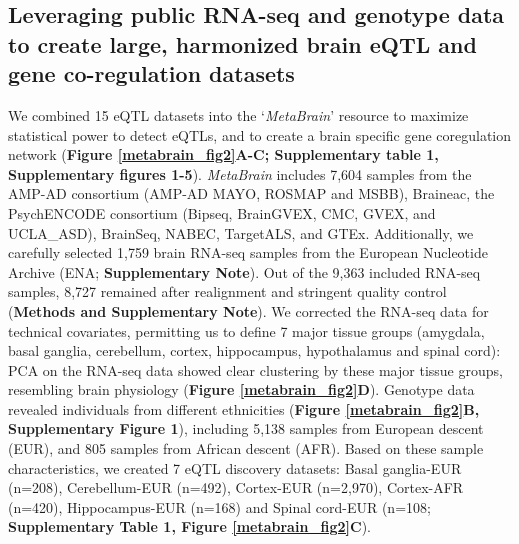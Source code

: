 \subsection{Leveraging public RNA-seq and genotype data to create large, harmonized brain eQTL and gene co-regulation datasets}
We combined 15 eQTL datasets into the ‘\emph{MetaBrain}’ resource to maximize statistical power to detect eQTLs, and to create a brain specific gene coregulation network (\textbf{Figure \ref{metabrain_fig2}A-C; Supplementary table 1, Supplementary figures 1-5}). \emph{MetaBrain} includes 7,604 samples from the AMP-AD consortium\cite{hodesAcceleratingMedicinesPartnership2016} (AMP-AD MAYO\cite{hodesAcceleratingMedicinesPartnership2016}, ROSMAP\cite{hodesAcceleratingMedicinesPartnership2016} and MSBB\cite{hodesAcceleratingMedicinesPartnership2016}), Braineac\cite{ramasamyGeneticVariabilityRegulation2014}, the PsychENCODE consortium\cite{consortium*RevealingBrainMolecular2018} (Bipseq\cite{wangComprehensiveFunctionalGenomic2018}, BrainGVEX\cite{wangComprehensiveFunctionalGenomic2018}, CMC\cite{fromerGeneExpressionElucidates2016}, GVEX, and UCLA\_ASD\cite{wangComprehensiveFunctionalGenomic2018}), BrainSeq\cite{brainseq2015}, NABEC\cite{gibbsAbundantQuantitativeTrait2010}, TargetALS\cite{prudencioDistinctBrainTranscriptome2015}, and GTEx\cite{donovanCellularDeconvolutionGTEx2020}. Additionally, we carefully selected 1,759 brain RNA-seq samples from the European Nucleotide Archive (ENA; \textbf{Supplementary Note})\cite{leinonenEuropeanNucleotideArchive2011}. Out of the 9,363 included RNA-seq samples, 8,727 remained after realignment and stringent quality control (\textbf{Methods and Supplementary Note}). We corrected the RNA-seq data for technical covariates, permitting us to define 7 major tissue groups (amygdala, basal ganglia, cerebellum, cortex, hippocampus, hypothalamus and spinal cord): PCA on the RNA-seq data showed clear clustering by these major tissue groups, resembling brain physiology (\textbf{Figure \ref{metabrain_fig2}D}). Genotype data revealed individuals from different ethnicities (\textbf{Figure \ref{metabrain_fig2}B, Supplementary Figure 1}), including 5,138 samples from European descent (EUR), and 805 samples from African descent (AFR). Based on these sample characteristics, we created 7 eQTL discovery datasets: Basal ganglia-EUR (n=208), Cerebellum-EUR (n=492), Cortex-EUR (n=2,970), Cortex-AFR (n=420), Hippocampus-EUR (n=168) and Spinal cord-EUR (n=108; \textbf{Supplementary Table 1, Figure \ref{metabrain_fig2}C}).

